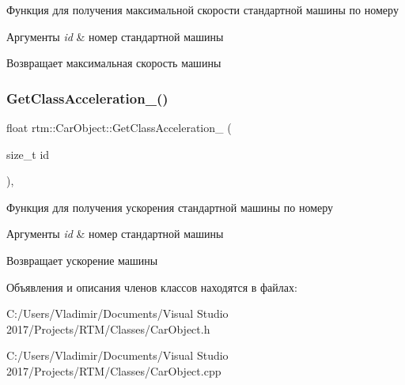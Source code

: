 Функция для получения максимальной скорости стандартной машины по номеру 


\begin{DoxyParams}{Аргументы}
{\em id} & номер стандартной машины \\
\hline
\end{DoxyParams}
\begin{DoxyReturn}{Возвращает}
максимальная скорость машины 
\end{DoxyReturn}
\mbox{\label{classrtm_1_1_car_object_a45d798bf2079173c677358b4b54d4e2b}} 
\subsubsection{\texorpdfstring{Get\+Class\+Acceleration\+\_\+()}{GetClassAcceleration\_()}}
{\footnotesize\ttfamily float rtm\+::\+Car\+Object\+::\+Get\+Class\+Acceleration\+\_\+ (\begin{DoxyParamCaption}\item[{size\+\_\+t}]{id }\end{DoxyParamCaption})\hspace{0.3cm}{\ttfamily [static]}, {\ttfamily [private]}}



Функция для получения ускорения стандартной машины по номеру 


\begin{DoxyParams}{Аргументы}
{\em id} & номер стандартной машины \\
\hline
\end{DoxyParams}
\begin{DoxyReturn}{Возвращает}
ускорение машины 
\end{DoxyReturn}


Объявления и описания членов классов находятся в файлах\+:\begin{DoxyCompactItemize}
\item 
C\+:/\+Users/\+Vladimir/\+Documents/\+Visual Studio 2017/\+Projects/\+R\+T\+M/\+Classes/Car\+Object.\+h\item 
C\+:/\+Users/\+Vladimir/\+Documents/\+Visual Studio 2017/\+Projects/\+R\+T\+M/\+Classes/Car\+Object.\+cpp\end{DoxyCompactItemize}
